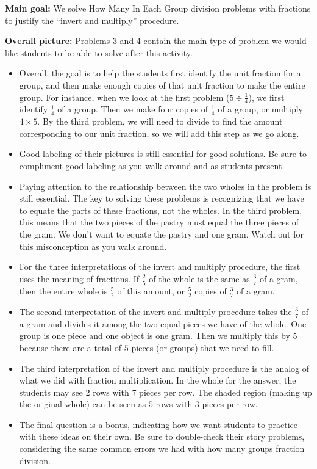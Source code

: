 \documentclass[nooutcomes,noauthor]{ximera}
\begin{document}
\begin{instructorNotes} 



{\bf Main goal:} We solve How Many In Each Group division problems with fractions to justify the ``invert and multiply'' procedure.


{\bf Overall picture:} Problems 3 and 4 contain the main type of problem we would like students to be able to solve after this activity. 






\begin{itemize}
	\item Overall, the goal is to help the students first identify the unit fraction for a group, and then make enough copies of that unit fraction to make the entire group. For instance, when we look at the first problem ($5 \div \frac{1}{4}$), we first identify $\frac{1}{4}$ of a group. Then we make four copies of $\frac{1}{4}$ of a group, or multiply $4 \times 5$. By the third problem, we will need to divide to find the amount corresponding to our unit fraction, so we will add this step as we go along.
	\item Good labeling of their pictures is still essential for good solutions. Be sure to compliment good labeling as you walk around and as students present.
	\item Paying attention to the relationship between the two wholes in the problem is still essential. The key to solving these problems is recognizing that we have to equate the parts of these fractions, not the wholes. In the third problem, this means that the two pieces of the pastry must equal the three pieces of the gram. We don't want to equate the pastry and one gram. Watch out for this misconception as you walk around.
	\item For the three interpretations of the invert and multiply procedure, the first uses the meaning of fractions. If $\frac{2}{5}$ of the whole is the same as $\frac{3}{7}$ of a gram, then the entire whole is $\frac{5}{2}$ of this amount, or $\frac{5}{2}$ copies of $\frac{3}{7}$ of a gram.
	\item The second interpretation of the invert and multiply procedure takes the $\frac{3}{7}$ of a gram and divides it among the two equal pieces we have of the whole. One group is one piece and one object is one gram. Then we multiply this by $5$ because there are a total of $5$ pieces (or groups) that we need to fill.
	\item The third interpretation of the invert and multiply procedure is the analog of what we did with fraction multiplication. In the whole for the answer, the students may see $2$ rows with $7$ pieces per row. The shaded region (making up the original whole) can be seen as $5$ rows with $3$ pieces per row.
	\item The final question is a bonus, indicating how we want students to practice with these ideas on their own. Be sure to double-check their story problems, considering the same common errors we had with how many groups fraction division.
\end{itemize}



\end{instructorNotes}
\end{document}
